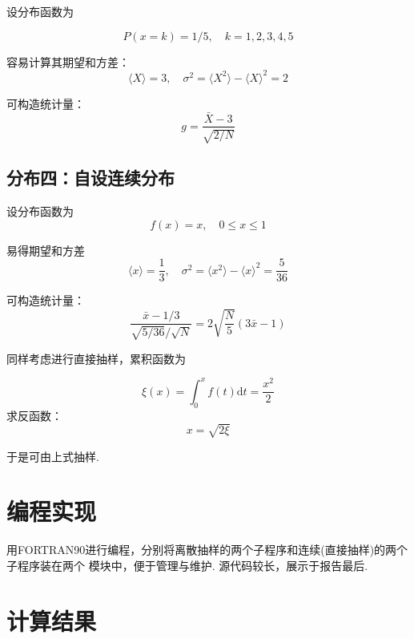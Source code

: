 \documentclass[12pt,a4paper,utf8]{ctexart}
\begin{document}
设分布函数为

\begin{equation}
    P(x = k) = 1/5,\quad k = 1, 2, 3, 4, 5
\end{equation}

容易计算其期望和方差：
\begin{equation}
    \langle X \rangle = 3,\quad \sigma^2 = 
    \langle X^2 \rangle - \langle X \rangle ^2 = 2
\end{equation}

可构造统计量：
\begin{equation}
    g = \frac{ \bar{X} - 3}{\sqrt{2/N}}
\end{equation}
\subsection{分布四：自设连续分布}

设分布函数为
\begin{equation}
    f(x) = x,\quad 0 \leq x \leq 1
\end{equation}

易得期望和方差
\begin{equation}
    \langle x \rangle = \frac{1}{3},\quad \sigma^2 = 
    \langle x^2 \rangle - \langle x \rangle ^2 = \frac{5}{36}
\end{equation}

可构造统计量：
\begin{equation}
    \frac{\bar{x} - 1/3}{\sqrt{5/36}/\sqrt{N}}=
    2 \sqrt{ \frac{N}{5}} (3\bar{x}-1)
\end{equation}

同样考虑进行直接抽样，累积函数为

\begin{equation}
    \xi(x) = \int _{0} ^{x} f(t) \textrm{d}t	= \frac{x^2}{2}
\end{equation}
求反函数：
\begin{equation}
    x = \sqrt{2\xi}
\end{equation}

于是可由上式抽样.

\section{编程实现}

用FORTRAN90进行编程，分别将离散抽样的两个子程序和连续(直接抽样)的两个子程序装在两个
模块中，便于管理与维护. 源代码较长，展示于报告最后.

\section{计算结果}
\end{document}
